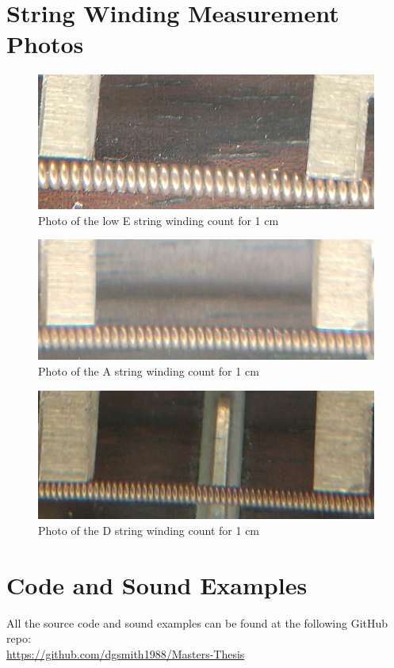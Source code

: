 \documentclass[../main.tex]{subfiles}
\begin{document}
\appendix

\chapter{String Winding Measurement Photos}

\begin{figure}[h]
    \centering
    \includegraphics[scale=.45]{./images/pictures/WindingsEZoom.png}
    \caption{Photo of the low E string winding count for 1 cm}
    \label{fig:EStringWindings}
\end{figure}

\begin{figure}[h]
    \centering
    \includegraphics[scale=.45]{./images/pictures/WindingsAZoom.png}
    \caption{Photo of the A string winding count for 1 cm}
    \label{fig:AStringWindings}
\end{figure}

\begin{figure}[h]
    \centering
    \includegraphics[scale=.5]{./images/pictures/WindingsDZoom.png}
    \caption{Photo of the D string winding count for 1 cm}
    \label{fig:DStringWindings}
\end{figure}


\chapter{Code and Sound Examples}
All the source code and sound examples can be found at the following GitHub repo:\\
\url{https://github.com/dgsmith1988/Masters-Thesis}
\end{document}
